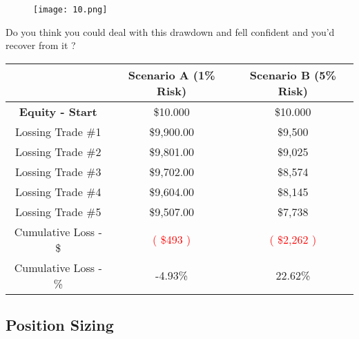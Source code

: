 \documentclass[10pt]{article}
\begin{document}
\begin{figure}[h]
\begin{center}
   \texttt{[image: 10.png]}
\end{center}
\end{figure}

\small{\begin{tcolorbox}[colback=gray!20!white,colframe=red!70!black,title=Question]
    Do you think you could deal with this drawdown and fell confident and you'd recover from it ?
\end{tcolorbox}}
\newpage

\vspace{0.3cm}

\renewcommand{\arraystretch}{1.5} %
\setlength{\tabcolsep}{10pt} %

\begin{center}
\begin{tabular}{|c|c|c|}
\cline{2-3}
  \multicolumn{1}{c|}{} & \textbf{Scenario A (1\% Risk)} & \textbf{Scenario B (5\% Risk)} \\
\hline
\textbf{Equity - Start} & \$10.000 & \$10.000 \\
\hline
Lossing Trade \#1 & \$9,900.00 & \$9,500 \\
\hline                     
Lossing Trade \#2 & \$9,801.00 & \$9,025 \\
\hline                     
Lossing Trade \#3 & \$9,702.00 & \$8,574 \\
\hline                     
Lossing Trade \#4 & \$9,604.00 & \$8,145 \\
\hline                     
Lossing Trade \#5 & \$9,507.00 & \$7,738 \\
\hline
  Cumulative Loss - \$ & \textcolor{red}{( \$493 )} & \textcolor{red}{( \$2,262 )} \\
\hline
Cumulative Loss - \% & -4.93\% & 22.62\% \\
\hline
\end{tabular}
\end{center}

\subsection{Position Sizing}
\end{document}
